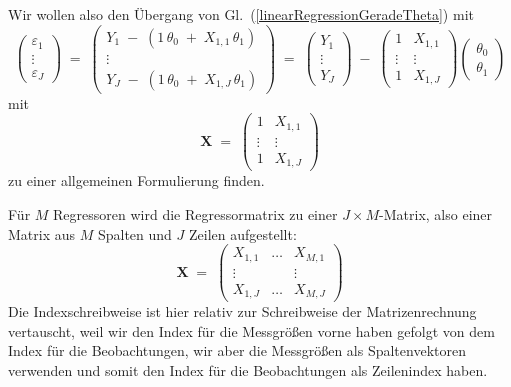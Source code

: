 Wir wollen also den Übergang von Gl.~(\ref{linearRegressionGeradeTheta}) mit
\begin{equation*}
\left(
\begin{array}{c}
\varepsilon_1\\
\vdots \\
\varepsilon_J
\end{array}
\right)  \; = \;
\left(
\begin{array}{c}
 Y_{1} \; - \; (1 \, \theta_0 \; + \;  X_{1,1} \, \theta_1)\\
\vdots \\
 Y_{J} \; - \; (1 \, \theta_0 \; + \;  X_{1,J} \, \theta_1)
\end{array}
\right) \; = \;
\left(
\begin{array}{c}
 Y_{1}\\
\vdots \\
 Y_{J}
\end{array}
\right) 
\; - \; 
\left(
\begin{array}{cc}
 1 &  X_{1,1} \\
\vdots & \vdots\\
 1 & X_{1,J} 
\end{array}
\right) 
\left(
\begin{array}{c}
\theta_0\\
\theta_1
\end{array}
\right)
\end{equation*}
mit
\begin{equation*}
\mathbf{X} \; = \;
\left(
\begin{array}{cc}
 1 &  X_{1,1} \\
\vdots & \vdots\\
 1 & X_{1,J} 
\end{array}
\right)
\end{equation*}
zu einer allgemeinen Formulierung finden.

Für $M$ Regressoren wird die Regressormatrix zu einer $J \times M$-Matrix, also einer Matrix
aus $M$ Spalten und $J$ Zeilen aufgestellt:
\begin{equation}
\mathbf{X} \; = \;
\left(
\begin{array}{ccc}
 X_{1,1} & \dots &  X_{M,1} \\
\vdots & & \vdots \\
 X_{1,J}  & \dots &  X_{M,J}
\end{array}
\right)
\end{equation}
Die Indexschreibweise ist hier relativ zur Schreibweise der Matrizenrechnung vertauscht, weil wir den Index für die
Messgrößen vorne haben gefolgt von dem Index für die Beobachtungen, wir aber die Messgrößen als
Spaltenvektoren verwenden und somit den Index für die Beobachtungen als Zeilenindex haben.

